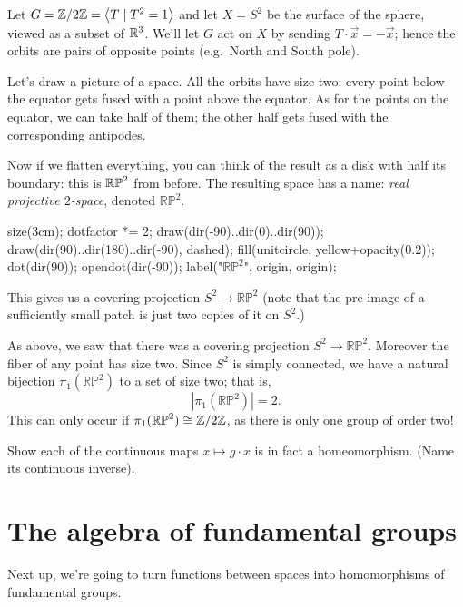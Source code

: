 \begin{example}[$\mathbb {RP}^2$]
	Let $G = \mathbb Z/2\mathbb Z = \left<T \mid T^2 = 1\right>$ and
	let $X = S^2$ be the surface of the sphere,
	viewed as a subset of $\mathbb R^3$.
	We'll let $G$ act on $X$ by sending $T \cdot \vec x = - \vec x$;
	hence the orbits are pairs of opposite points (e.g.\ North and South pole).

	Let's draw a picture of a space.
	All the orbits have size two:
	every point below the equator gets fused with a point above the equator.
	As for the points on the equator, we can take half of them; the other half
	gets fused with the corresponding antipodes.

	Now if we flatten everything,
	you can think of the result as a disk with half its boundary:
	this is $\mathbb{RP}^2$ from before.
	The resulting space has a name: \emph{real projective $2$-space},
	denoted $\mathbb{RP}^2$.
	\begin{center}
		\begin{asy}
			size(3cm);
			dotfactor *= 2;
			draw(dir(-90)..dir(0)..dir(90));
			draw(dir(90)..dir(180)..dir(-90), dashed);
			fill(unitcircle, yellow+opacity(0.2));
			dot(dir(90));
			opendot(dir(-90));
			label("$\mathbb{RP}^2$", origin, origin);
		\end{asy}
	\end{center}

	This gives us a covering projection $S^2 \to \mathbb{RP}^2$
	(note that the pre-image of a sufficiently small patch is just two copies
	of it on $S^2$.)
\end{example}
\begin{example}
	As above, we saw that there was a covering projection
	$S^2 \to \mathbb{RP}^2$.
	Moreover the fiber of any point has size two.
	Since $S^2$ is simply connected, we have a natural bijection
	$\pi_1(\mathbb{RP}^2)$ to a set of size two; that is,
	\[ \left\lvert \pi_1(\mathbb{RP}^2) \right\rvert = 2. \]
	This can only occur if $\pi_1(\mathbb{RP}^2) \cong \mathbb Z/2\mathbb Z$,
	as there is only one group of order two!
\end{example}

\begin{ques}
	Show each of the continuous maps $x \mapsto g \cdot x$ is in fact a homeomorphism.
	(Name its continuous inverse).
\end{ques}

\section{The algebra of fundamental groups}
Next up, we're going to turn functions between spaces into homomorphisms of fundamental groups.

